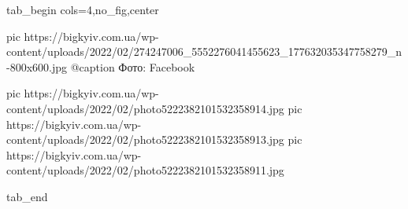 
 
 
 
 


\ifcmt
  tab_begin cols=4,no_fig,center

     pic https://bigkyiv.com.ua/wp-content/uploads/2022/02/274247006_5552276041455623_177632035347758279_n-800x600.jpg
		 @caption Фото: Facebook

		 pic https://bigkyiv.com.ua/wp-content/uploads/2022/02/photo5222382101532358914.jpg
		 pic https://bigkyiv.com.ua/wp-content/uploads/2022/02/photo5222382101532358913.jpg
		 pic https://bigkyiv.com.ua/wp-content/uploads/2022/02/photo5222382101532358911.jpg

  tab_end
\fi
